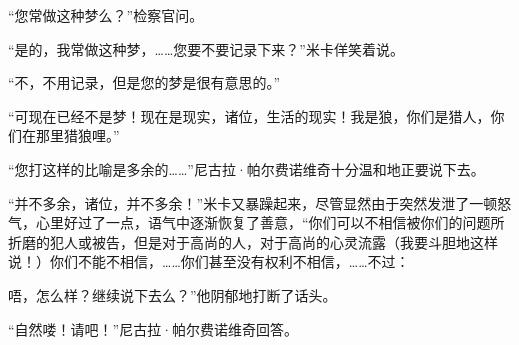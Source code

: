 \par “您常做这种梦么？”检察官问。
\par “是的，我常做这种梦，……您要不要记录下来？”米卡佯笑着说。
\par “不，不用记录，但是您的梦是很有意思的。”
\par “可现在已经不是梦！现在是现实，诸位，生活的现实！我是狼，你们是猎人，你们在那里猎狼哩。”
\par “您打这样的比喻是多余的……”尼古拉·帕尔费诺维奇十分温和地正要说下去。
\par “并不多余，诸位，并不多余！”米卡又暴躁起来，尽管显然由于突然发泄了一顿怒气，心里好过了一点，语气中逐渐恢复了善意，“你们可以不相信被你们的问题所折磨的犯人或被告，但是对于高尚的人，对于高尚的心灵流露（我要斗胆地这样说！）你们不能不相信，……你们甚至没有权利不相信，……不过：
\par 唔，怎么样？继续说下去么？”他阴郁地打断了话头。
\par “自然喽！请吧！”尼古拉·帕尔费诺维奇回答。
